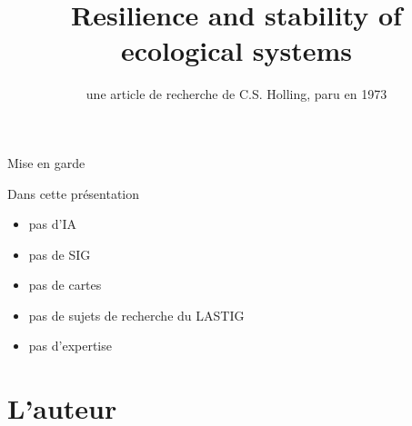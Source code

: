 \documentclass[11,aspectratio=1610]{beamer}
\title{Resilience and stability of ecological systems}
\subtitle{une article de recherche de C.S. Holling, paru en 1973}
\date{}
\author{}
\begin{document}
\maketitle  




\begin{frame}{Mise en garde}

Dans cette présentation
\begin{itemize}
  \item pas d'IA
  \item pas de SIG
  \item pas de cartes
  \item pas de sujets de recherche du LASTIG 
  \item pas d'expertise
\end{itemize}

\end{frame}


\section{L'auteur} 
\end{document}
